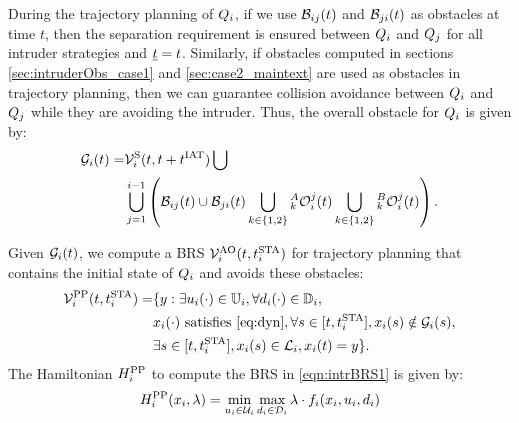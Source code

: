 During the trajectory planning of $Q_i$, if we use $\mathcal{B}_{ij}(t)$ and $\mathcal{B}_{ji}(t)$ as obstacles at time $t$, then the separation requirement is ensured between $Q_i$ and $Q_j$ for all intruder strategies and $\underline{t} = t$. Similarly, if obstacles computed in sections \ref{sec:intruderObs_case1} and \ref{sec:case2_maintext} are used as obstacles in trajectory planning, then we can guarantee collision avoidance between $Q_i$ and $Q_j$ while they are avoiding the intruder. Thus, the overall obstacle for $Q_i$ is given by:
\begin{equation} \label{eq:obsseti_intr}
\begin{aligned}
\obsset_i(t)  =  & \brs^{\text{S}}_{i}(t, t+\iat) \bigcup \\
& \bigcup_{j=1}^{i-1} \left( \buff_{ij}(t) \cup \buff_{ji}(t) \bigcup_{k \in\{1, 2\}} {}_k^A\ioset_i^j(t) \bigcup_{k \in\{1, 2\}} {}_k^B\ioset_i^j(t) \right).
\end{aligned}
\end{equation}

Given $\mathcal{G}_i(t)$, we compute a BRS $\mathcal{V}^{\text{AO}}_{i}(t, t^\text{STA}_i)$ for trajectory planning that contains the initial state of $Q_i$ and avoids these obstacles:
\begin{equation} \label{eqn:intrBRS1}
\begin{aligned}
\brs^{\text{PP}}_{i}(t, \sta_i) = & \{y: \exists \ctrl_i(\cdot) \in \cfset_i, \forall \dstb_i(\cdot) \in \dfset_i, \\
& \state_i(\cdot) \text{ satisfies \eqref{eq:dyn}}, \forall s \in [t, \sta_i], \state_i(s) \notin \obsset_i(s), \\
& \exists s \in [t, \sta_i], \state_i(s) \in \targetset_i, \state_i(t) = y \}.
\end{aligned}
\end{equation}
The Hamiltonian $H^{\text{PP}}_{i}$ to compute the BRS in \eqref{eqn:intrBRS1} is given by:
\begin{equation} \label{eqn:BRSham}
\ham^{\text{PP}}_{i}(\state_i, \costate) = \min_{\ctrl_i \in \cset_i} \max_{\dstb_i \in \dset_i} \costate \cdot f_i (\state_i, \ctrl_i, \dstb_i)
\end{equation}

